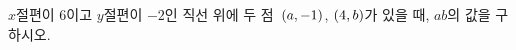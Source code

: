 $x$절편이 $6$이고 $y$절편이 $-2$인 직선 위에 두 점~$(a{,}\mkern3mu\mathopen{}-1)$, $(4{,}\mkern3mu\mathopen{}b)$가 있을 때, $ab$의 값을 구하시오.

